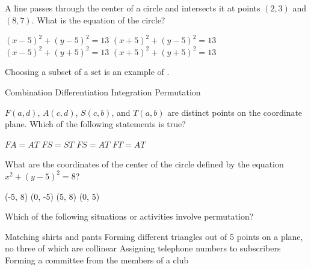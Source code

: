 \begin{questions}

\question A line passes through the center of a circle and intersects it at points $(2, 3)$ and $(8, 7)$. What is the equation of the circle? 

\begin{multicols}{2}
\begin{choices} 
\CorrectChoice $(x-5)^2 + (y-5)^2 = 13$ 
\choice $(x+5)^2 + (y-5)^2 = 13$ 
\choice $(x-5)^2 + (y+5)^2 = 13$ 
\choice $(x+5)^2 + (y+5)^2 = 13$ 
\end{choices}
\end{multicols}

\question Choosing  a  subset  of  a  set  is an  example  of \blank.
\begin{multicols}{4}
\begin{choices}  
\CorrectChoice Combination 
\choice Differentiation 
\choice Integration 
\choice Permutation 
\end{choices}
\end{multicols}

\question $F(a, d)$, $A(c, d)$, $S(c, b)$, and $T(a, b)$ are distinct points on the coordinate plane. Which of the following statements is true? 

\begin{multicols}{4}
\begin{choices}  
\choice $FA = AT$ 
\choice $FS = ST$ 
\CorrectChoice $FS = AT$ 
\choice $FT = AT$ 
\end{choices}
\end{multicols}

\question What are the coordinates of the center of the circle defined by the equation $x^2 + (y-5)^2 = 8$?

\begin{multicols}{4}
\begin{choices}  
\choice (-5, 8)
\choice (0, -5)
\choice (5, 8)
\CorrectChoice (0, 5)
\end{choices}
\end{multicols}

\question Which  of  the  following  situations or activities  involve  permutation? 
\begin{choices}  
\choice Matching  shirts  and  pants
\CorrectChoice Forming  different  triangles  out  of  5  points  on  a  plane,  no  three  of                      which  are collinear
\choice Assigning  telephone  numbers to  subscribers
\choice Forming  a  committee  from  the  members of  a  club
\end{choices}


\end{questions}

